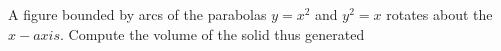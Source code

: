 
%
%
%
%
% 
% 
\question[5] A figure bounded by arcs of the parabolas $y=x^2$ and $y^2=x$ rotates
about the $x-axis$. Compute the volume of the solid thus generated


